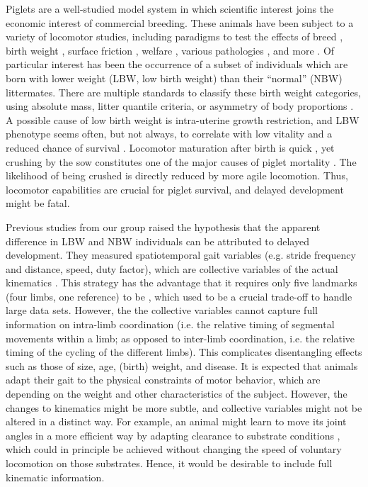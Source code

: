 Piglets are a well-studied model system in which scientific interest joins the economic interest of commercial breeding.
These animals have been subject to a variety of locomotor studies, including paradigms to test the effects of breed \citep{Mirkiani2021}, birth weight \citep{VandenHole2017,VandenHole2018,VandenHole2021}, surface friction \citep{VanWachenfelt2008}, welfare \citep{Guesgen2017}, various pathologies \citep{Abell2014,LaVallee2020,Benasson2020}, and more \citep[\textit{cf.}][]{Netukova2021}.
Of particular interest has been the occurrence of a subset of individuals which are born with lower weight (LBW, low birth weight) than their ``normal'' (NBW) littermates.
There are multiple standards to classify these birth weight categories, using absolute mass, litter quantile criteria, or asymmetry of body proportions \citep{Quiniou2002,VanTichelen2021,Wang2016,DInca2011,Feldpausch2019,Roehe2000,Amdi2013}.
A possible cause of low birth weight is intra-uterine growth restriction, and LBW phenotype seems often, but not always, to correlate with low vitality and a reduced chance of survival \citep{Baxter2008,Hales2013,Muns2013,VanGinneken2022}.
Locomotor maturation after birth is quick \citep{Andersen2016,VandenHole2017}, yet crushing by the sow constitutes one of the major causes of piglet mortality \citep{Marchant2000,Edwards2015}.
The likelihood of being crushed is directly reduced by more agile locomotion.
Thus, locomotor capabilities are crucial for piglet survival, and delayed development might be fatal.

Previous studies from our group \citep{VandenHole2017,VandenHole2021} raised the hypothesis that the apparent difference in LBW and NBW individuals can be attributed to delayed development.
They measured spatiotemporal gait variables (e.g. stride frequency and distance, speed, duty factor), which are collective variables of the actual kinematics \citep[\textit{cf.}][]{Newell2021,Nishikawa2007,Aerts2000}.
This strategy has the advantage that it requires only five landmarks (four limbs, one reference) to be , which used to be a crucial trade-off to handle large data sets.
However, the the collective variables cannot capture full information on intra-limb coordination (i.e. the relative timing of segmental movements within a limb; as opposed to inter-limb coordination, i.e. the relative timing of the cycling of the different limbs).
This complicates disentangling effects such as those of size, age, (birth) weight, and disease.
It is expected that animals adapt their gait to the physical constraints of motor behavior, which are depending on the weight and other characteristics of the subject.
However, the changes to kinematics might be more subtle, and collective variables might not be altered in a distinct way.
For example, an animal might learn to move its joint angles in a more efficient way by adapting clearance to substrate conditions \citep{VanWachenfelt2008,Mielke2019}, which could in principle be achieved without changing the speed of voluntary locomotion on those substrates.
Hence, it would be desirable to include full kinematic information.


